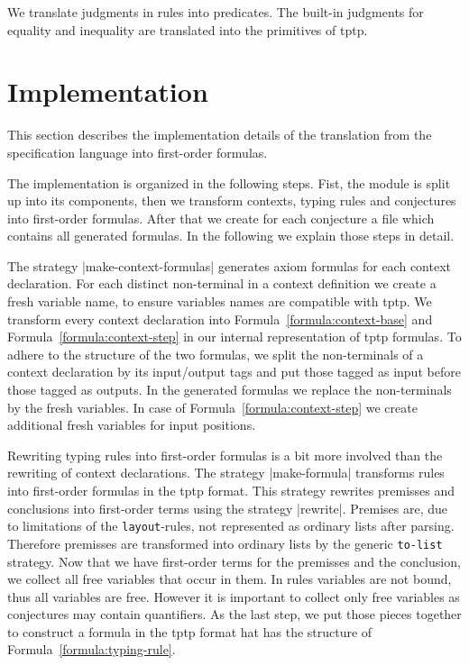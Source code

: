 We translate judgments in rules into predicates. The built-in
judgments for equality and inequality are translated into the
primitives of \gls{tptp}.
\section{Implementation}
\label{sec:implementation-fof}
This section describes the implementation details of the translation
from the specification language into first-order formulas.


The implementation is organized in the following steps. Fist, the
module is split up into its components, then we transform contexts,
typing rules and conjectures into first-order formulas. After that we
create for each conjecture a file which contains all generated
formulas. In the following we explain those steps in detail.

The strategy \code|make-context-formulas| generates axiom formulas for
each context declaration. For each distinct non-terminal in a context
definition we create a fresh variable name, to ensure variables names
are compatible with \gls{tptp}. We transform every context declaration
into Formula~\ref{formula:context-base} and
Formula~\ref{formula:context-step} in our internal representation of
\gls{tptp} formulas. To adhere to the structure of the two formulas,
we split the non-terminals of a context declaration by its
input/output tags and put those tagged as input before those tagged as
outputs. In the generated formulas we replace the non-terminals by the
fresh variables. In case of Formula~\ref{formula:context-step} we
create additional fresh variables for input positions.

Rewriting typing rules into first-order formulas is a bit more
involved than the rewriting of context declarations. The strategy
\code|make-formula| transforms rules into first-order formulas in the
\gls{tptp} format. This strategy rewrites premisses and conclusions
into first-order terms using the strategy \code|rewrite|. Premises
are, due to limitations of the \texttt{layout}-rules, not represented
as ordinary lists after parsing. Therefore premisses are transformed
into ordinary lists by the generic \texttt{to-list} strategy. Now that
we have first-order terms for the premisses and the conclusion, we
collect all free variables that occur in them. In rules variables are
not bound, thus all variables are free. However it is important to
collect only free variables as conjectures may contain quantifiers. As
the last step, we put those pieces together to construct a formula in
the \gls{tptp} format hat has the structure of
Formula~\ref{formula:typing-rule}.

